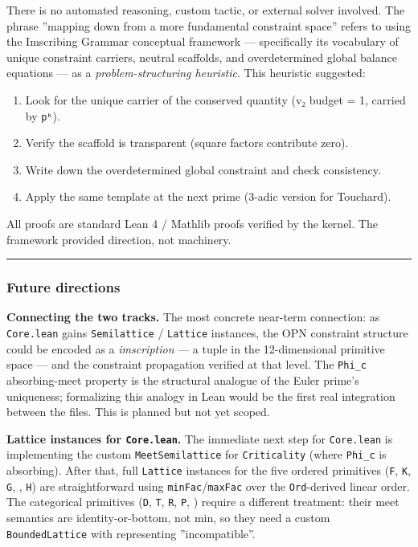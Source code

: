 \documentclass[12pt,a4paper]{article}
\begin{document}
There is no automated reasoning, custom tactic, or external solver involved. The phrase
''mapping down from a more fundamental constraint space'' refers to using the Imscribing Grammar
conceptual framework --- specifically its vocabulary of unique constraint carriers, neutral
scaffolds, and overdetermined global balance equations --- as a \emph{problem-structuring heuristic}.
This heuristic suggested:

\begin{enumerate}
    \item Look for the unique carrier of the conserved quantity (v₂ budget = 1, carried by \texttt{pᵏ}).
    \item Verify the scaffold is transparent (square factors contribute zero).
    \item Write down the overdetermined global constraint and check consistency.
    \item Apply the same template at the next prime (3-adic version for Touchard).
\end{enumerate}

All proofs are standard Lean 4 / Mathlib proofs verified by the kernel. The framework provided
direction, not machinery.

\begin{center}
\rule{0.5\textwidth}{0.4pt}
\end{center}

\subsubsection{Future directions}

\textbf{Connecting the two tracks.} The most concrete near-term connection: as \texttt{Core.lean} gains
\texttt{Semilattice} / \texttt{Lattice} instances, the OPN constraint structure could be encoded as a
\emph{imscription} --- a tuple in the 12-dimensional primitive space --- and the constraint propagation
verified at that level. The \texttt{Phi\_c} absorbing-meet property is the structural analogue of
the Euler prime's uniqueness; formalizing this analogy in Lean would be the first real
integration between the files. This is planned but not yet scoped.

\textbf{Lattice instances for \texttt{Core.lean}.} The immediate next step for \texttt{Core.lean} is implementing
the custom \texttt{MeetSemilattice} for \texttt{Criticality} (where \texttt{Phi\_c} is absorbing). After that, full
\texttt{Lattice} instances for the five ordered primitives (\texttt{F}, \texttt{K}, \texttt{G}, \texttt{\Omega}, \texttt{H}) are
straightforward using \texttt{minFac}/\texttt{maxFac} over the \texttt{Ord}-derived linear order. The categorical
primitives (\texttt{D}, \texttt{T}, \texttt{R}, \texttt{P}, \texttt{\Gamma}) require a different treatment: their meet semantics are
identity-or-bottom, not min, so they need a custom \texttt{BoundedLattice} with \texttt{\perp} representing
''incompatible''.
\end{document}
